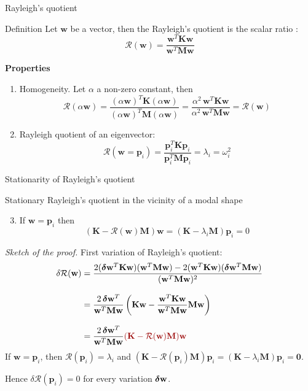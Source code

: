 \documentclass[aspectratio=169]{beamer}
\begin{document}
\begin{frame}{Rayleigh's quotient}
  \small
  \begin{block}{Definition}
    Let $\mathbf w$ be a vector, then the Rayleigh's quotient is the scalar ratio :
    $$\mathcal R(\mathbf w)=\frac{\mathbf w^T\mathbf K\mathbf w}{\mathbf w^T\mathbf M\mathbf w}$$
  \end{block}
  \textbf{Properties}
  \begin{enumerate}
    \item Homogeneity. Let $\alpha$ a non-zero constant, then
          $$\mathcal{R}(\alpha\mathbf w)=\frac{(\alpha\mathbf w)^T\mathbf K(\alpha\mathbf w)}{(\alpha\mathbf w)^T\mathbf M(\alpha\mathbf w)}=\frac{\alpha^2\, \mathbf w^T\mathbf K\mathbf w}{\alpha^2\, \mathbf w^T\mathbf M\mathbf w}=\mathcal{R}(\mathbf w)$$
    \item Rayleigh quotient of an eigenvector:
          $$\mathcal{R}(\mathbf w=\mathbf p_i)=\frac{\mathbf p_i^T\mathbf K\mathbf p_i}{\mathbf p_i^T\mathbf M\mathbf p_i}=\lambda_i=\omega_i^2$$
  \end{enumerate}
\end{frame}

\begin{frame}{Stationarity of Rayleigh's quotient}
  \small
  \vspace{-0.2cm}
  \begin{block}{ \small Stationary Rayleigh's quotient in the vicinity of a modal shape}
    \begin{enumerate}
      \setcounter{enumi}{2}
      \item If $\mathbf{w} = \mathbf{p}_i$ then
            \[
              (\mathbf{K} - \mathcal{R}(\mathbf{w}) \mathbf{M})\mathbf{w} = (\mathbf{K} - \lambda_i \mathbf{M}) \mathbf{p}_i  = 0
            \]
    \end{enumerate}
  \end{block}
  \vspace{0.2cm}
  \emph{Sketch of the proof.} First variation of Rayleigh's quotient:
  \begin{align*}
    \delta \mathcal{R}(\mathbf{w})
     & = \frac{2(\bolddelta \mathbf{w}^T\mathbf{K} \mathbf{w})(\mathbf{w}^T\mathbf{M} \mathbf{w})
    - 2(\mathbf{w}^T\mathbf{K} \mathbf{w})(\bolddelta\mathbf{w}^T\mathbf{M} \mathbf{w})}{(\mathbf{w}^T\mathbf{M} \mathbf{w})^2}              \\[0.8em]
     & = \frac{2 \, \bolddelta \mathbf{w}^T}{\mathbf{w}^T\mathbf{M} \mathbf{w}}
    \left( \mathbf{K} \mathbf{w} - \frac{\mathbf{w}^T\mathbf{K} \mathbf{w}}{\mathbf{w}^T\mathbf{M} \mathbf{w}} \mathbf{M} \mathbf{w} \right) \\[0.8em]
     & = \frac{2 \, \bolddelta \mathbf{w}^T}{\mathbf{w}^T\mathbf{M} \mathbf{w}}
    {\color{darkred}(\mathbf{K} - \mathcal{R}(\mathbf{w}) \mathbf{M})\mathbf{w}}
  \end{align*}
  If $\mathbf{w}=\mathbf{p}_i$, then $\mathcal{R}(\mathbf{p}_i)=\lambda_i$ and $(\mathbf{K}-\mathcal{R}(\mathbf{p}_i)\mathbf{M})\mathbf{p}_i
    =(\mathbf{K}-\lambda_i\mathbf{M})\mathbf{p}_i=\mathbf 0$.

  Hence \(\delta\mathcal{R}(\mathbf{p}_i)=0\) for every variation
  \(\boldsymbol\delta\mathbf{w}\).
\end{frame}
\end{document}

